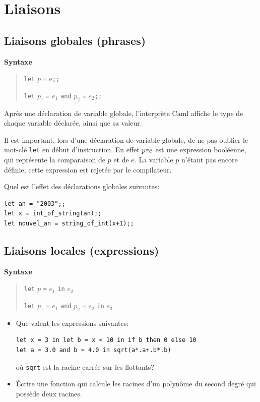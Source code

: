 \documentclass[11pt, a4paper]{article}
\begin{document}
\section{Liaisons}

\subsection{Liaisons globales (phrases)}

{\bf Syntaxe}
\begin{quote}
  \verb+let+ $p$ \verb+=+ e\verb+;;+

  \verb+let+ $p_1$ \verb+=+ $e_1$
  \verb+and+ $p_2$ \verb+=+ $e_2$\verb+;;+
\end{quote}

Après une déclaration de variable globale, l'interprète Caml affiche
le type de chaque variable déclarée, ainsi que sa valeur.

Il est important, lors d'une déclaration de variable globale, de ne
pas oublier le mot-clé {\tt let} en début d'instruction. En effet $p
\verb+=+ e$ est une expression booléenne, qui représente la
comparaison de $p$ et de $e$. La variable $p$ n'étant pas encore
définie, cette expression est rejetée par le compilateur.

\medskip

\noindent
Quel est l'effet des déclarations globales suivantes:

\begin{verbatim}
let an = "2003";;
let x = int_of_string(an);;
let nouvel_an = string_of_int(x+1);;
\end{verbatim}


\subsection{Liaisons locales (expressions)}

{\bf Syntaxe}
\begin{quote}
  \verb+let+ $p$ \verb+=+ $e_1$ \verb+in+ $e_2$

  \verb+let+ $p_1$ \verb+=+ $e_1$
  \verb+and+ $p_2$ \verb+=+ $e_2$
  \verb+in+ $e_3$
\end{quote}

\begin{itemize}
\item Que valent les expressions suivantes:
\begin{verbatim}
let x = 3 in let b = x < 10 in if b then 0 else 10
let a = 3.0 and b = 4.0 in sqrt(a*.a+.b*.b)
\end{verbatim}
o\`u \verb+sqrt+ est la racine carrée sur les flottants?

\item Écrire une fonction qui calcule les racines d'un polyn\^ome
du second degré qui possède deux racines.
\end{itemize}
\end{document}

